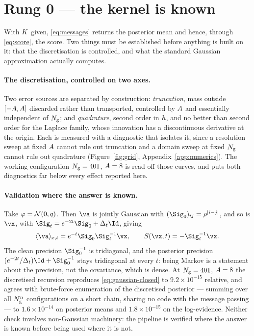 \documentclass{article}
\begin{document}
\section{Rung 0 --- the kernel is known}
\label{sec:rung0}

With $K$ given, \eqref{eq:messages} returns the posterior mean and hence, through
\eqref{eq:score}, the score. Two things must be established before anything is built on it: that
the discretisation is controlled, and what the standard Gaussian approximation actually computes.

\paragraph{The discretisation, controlled on two axes.} Two error sources are separated by
construction: \emph{truncation}, mass outside $[-A,A]$ discarded rather than
transported, controlled by $A$ and essentially independent of $N_{\mathrm{g}}$; and
\emph{quadrature}, second order in $h$, and no better than second order for the Laplace
family, whose innovation has a discontinuous derivative at the origin. Each is measured with a
diagnostic that isolates it, since a resolution sweep at fixed $A$ cannot rule out
truncation and a domain sweep at fixed $N_{\mathrm{g}}$ cannot rule out quadrature
(Figure~\ref{fig:grid}, Appendix~\ref{app:numerics}). The working configuration $N_{\mathrm{g}}=401$,
$A=8$ is read off those curves, and puts both diagnostics far below every effect
reported here.

\paragraph{Validation where the answer is known.} Take $\varphi=\mathcal{N}\!\left(0,q\right)$. Then $\va$ is
jointly Gaussian with $(\Sig_0)_{ij}=\corr^{|i-j|}$, and so is $\vx$, with
$\Sig_t = e^{-2t}\Sig_0 + \Dt \Id$, giving
\begin{equation}
\label{eq:gaussian-closed}
\pmean{\va} = e^{-t}\Sig_0\Sig_t^{-1}\vx,
\qquad
\score(\vx,t) = -\Sig_t^{-1}\vx .
\end{equation}
The clean precision $\Sig_0^{-1}$ is tridiagonal, and the posterior precision
$(e^{-2t}/\Dt)\Id + \Sig_0^{-1}$ stays tridiagonal at every $t$: being Markov is a statement about
the precision, not the covariance, which is dense. At $N_{\mathrm{g}}=401$, $A=8$ the discretised
recursion reproduces \eqref{eq:gaussian-closed} to $9.2\times10^{-15}$ relative, and agrees with
brute-force enumeration of the discretised posterior --- summing over all $N_{\mathrm{g}}^{n}$
configurations on a short chain, sharing no code with the message passing --- to
$1.6\times10^{-14}$ on posterior means and $1.8\times10^{-15}$ on the log-evidence. Neither check
involves non-Gaussian machinery: the pipeline is verified where the answer is known before being
used where it is not.
\end{document}
